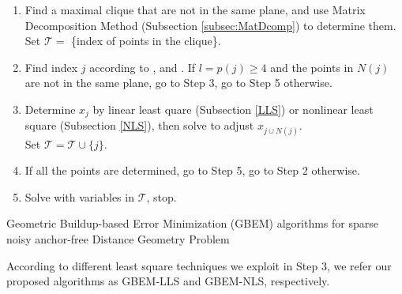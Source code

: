 \documentclass[a4paper,12pt]{article}
\begin{document}
\begin{algorithm}[H]
\begin{enumerate}[Step 1]
  \item Find a maximal clique that are not in the same plane, and use Matrix Decomposition Method (Subsection \ref{subsec:MatDcomp}) to determine them. Set $\mathcal{T}=$ \{index of points in the clique\}.
  \item Find index $j$ according to ,  and . If $l=p(j)\geq 4$ and the points in $N(j)$ are not in the same plane, go to Step 3, go to Step 5 otherwise.
  \item Determine $x_j$ by linear least quare (Subsection \ref{LLS}) or nonlinear least square (Subsection \ref{NLS}), then solve  to adjust $x_{j\cup N(j)}$. \\Set $\mathcal{T}=\mathcal{T}\cup \{j\}$.
  \item If all the points are determined, go to Step 5, go to Step 2 otherwise.
  \item Solve  with variables in $\mathcal{T}$, stop.
\end{enumerate}
\caption{Geometric Buildup-based Error Minimization (GBEM) algorithms for sparse noisy anchor-free Distance Geometry Problem}
\label{alg:EGB}
\end{algorithm}
According to different least square techniques we exploit in Step 3, we refer our proposed algorithms as GBEM-LLS and GBEM-NLS, respectively.

%
%
%
\end{document}
